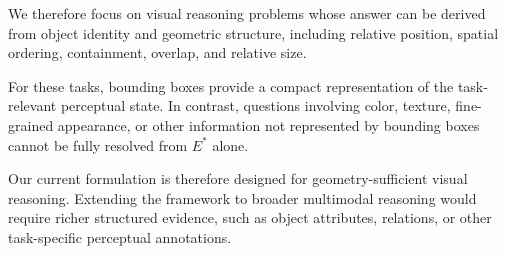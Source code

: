 We therefore focus on visual reasoning problems whose answer can be derived from object identity and geometric structure, including relative position, spatial ordering, containment, overlap, and relative size.

For these tasks, bounding boxes provide a compact representation of the task-relevant perceptual state.
In contrast, questions involving color, texture, fine-grained appearance, or other information not represented by bounding boxes cannot be fully resolved from $E^*$ alone.

Our current formulation is therefore designed for geometry-sufficient visual reasoning.
Extending the framework to broader multimodal reasoning would require richer structured evidence, such as object attributes, relations, or other task-specific perceptual annotations.